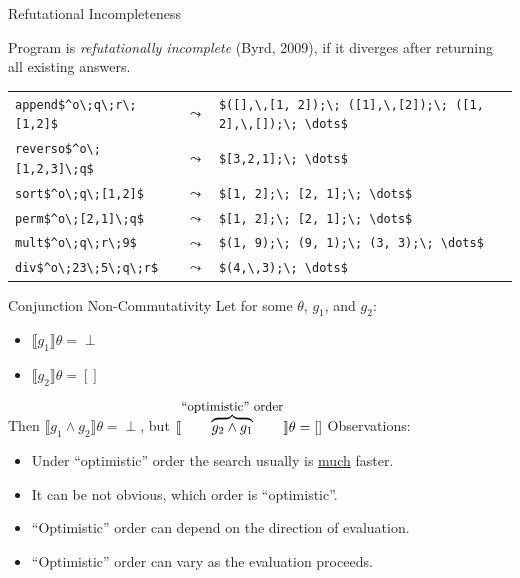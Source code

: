 \documentclass{beamer}
\let\\\tabularnewline
\let\\\tabularnewline
\theoremstyle{definition}
\theoremstyle{plain} %
\begin{document}
\begin{frame}[fragile]{Refutational Incompleteness}

Program is \emph{refutationally incomplete} (Byrd, 2009), if it diverges after returning all existing answers.
\vskip10mm

\begin{tabular}{lcl}
  \lstinline|append$^o\;q\;r\;[1,2]$| & $\leadsto$ & \lstinline|$([],\,[1, 2]);\; ([1],\,[2]);\; ([1, 2],\,[]);\; \dots$|\\[2mm]
  \lstinline|reverso$^o\;[1,2,3]\;q$| & $\leadsto$ & \lstinline|$[3,2,1];\; \dots$|\\[2mm]
  \lstinline|sort$^o\;q\;[1,2]$| & $\leadsto$ & \lstinline|$[1, 2];\; [2, 1];\; \dots$|\\[2mm]
  \lstinline|perm$^o\;[2,1]\;q$| & $\leadsto$ & \lstinline|$[1, 2];\; [2, 1];\; \dots$|\\[2mm]
  \lstinline|mult$^o\;q\;r\;9$| & $\leadsto$ & \lstinline|$(1, 9);\; (9, 1);\; (3, 3);\; \dots$|\\[2mm]
  \lstinline|div$^o\;23\;5\;q\;r$| & $\leadsto$ & \lstinline|$(4,\,3);\; \dots$|
\end{tabular}

\vskip3mm

\end{frame}

\begin{frame}{Conjunction Non-Commutativity}
\vskip5mm
Let for some $\theta$, $g_1$, and $g_2$:

\begin{itemize}
\item $\llbracket g_1\rrbracket\theta=\perp$
\item $\llbracket g_2\rrbracket\theta=[]$
\end{itemize}
\vskip5mm
Then $\llbracket g_1\wedge g_2\rrbracket\theta=\perp$, but $\llbracket\overbrace{g_2\wedge g_1}^{\mbox{\small ``optimistic'' order}}\rrbracket\theta=[]$
\vskip5mm
Observations:
\begin{itemize}
 \item Under ``optimistic'' order the search usually is \underline{much} faster.
 \item It can be not obvious, which order is ``optimistic''.
 \item ``Optimistic'' order can depend on the direction of evaluation.
 \item ``Optimistic'' order can vary as the evaluation proceeds.
\end{itemize}

\end{frame}
\end{document}
